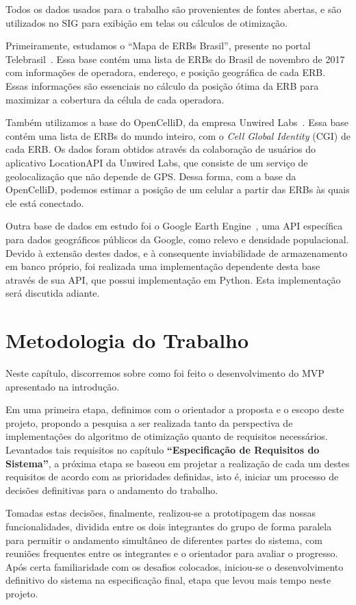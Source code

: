 \documentclass[]{politex}
\begin{document}
Todos os dados usados para o trabalho são provenientes de fontes abertas, e são
utilizados no SIG para exibição em telas ou cálculos de otimização.

Primeiramente, estudamos o ``Mapa de ERBs Brasil'', presente no portal
Telebrasil~\cite{mapa-erb}. Essa base contém uma lista de ERBs do Brasil de
novembro de 2017 com informações de operadora, endereço, e posição geográfica de
cada ERB. Essas informações são essenciais no cálculo da posição ótima da ERB
para maximizar a cobertura da célula de cada operadora.

Também utilizamos a base do OpenCelliD, da empresa Unwired
Labs~\cite{opencellid}. Essa base contém uma lista de ERBs do mundo inteiro, com
o \textit{Cell Global Identity} (CGI) de cada ERB. Os dados foram
obtidos através da colaboração de usuários do aplicativo LocationAPI da Unwired
Labs, que consiste de um serviço de geolocalização que não depende de GPS. Dessa
forma, com a base da OpenCelliD, podemos estimar a posição de um celular a
partir das ERBs às quais ele está conectado.

Outra base de dados em estudo foi o Google Earth Engine~\cite{earthengine}, uma
API específica para dados geográficos públicos da Google, como relevo e
densidade populacional. Devido à extensão destes dados, e à consequente
inviabilidade de armazenamento em banco próprio, foi realizada uma implementação
dependente desta base através de sua API, que possui implementação em Python.
Esta implementação será discutida adiante.

\chapter{Metodologia do Trabalho}

Neste capítulo, discorremos sobre como foi feito o desenvolvimento do MVP
apresentado na introdução.

Em uma primeira etapa, definimos com o orientador a proposta e o escopo deste
projeto, propondo a pesquisa a ser realizada tanto da perspectiva de
implementações do algoritmo de otimização quanto de requisitos necessários.
Levantados tais requisitos no capítulo \textbf{``Especificação de Requisitos do
Sistema''}, a próxima etapa se baseou em projetar a realização de cada um destes
requisitos de acordo com as prioridades definidas, isto é, iniciar um processo
de decisões definitivas para o andamento do trabalho.

Tomadas estas decisões, finalmente, realizou-se a prototipagem das nossas
funcionalidades, dividida entre os dois integrantes do grupo de forma paralela
para permitir o andamento simultâneo de diferentes partes do sistema, com
reuniões frequentes entre os integrantes e o orientador para avaliar o
progresso. Após certa familiaridade com os desafios colocados, iniciou-se o
desenvolvimento definitivo do sistema na especificação final, etapa que levou
mais tempo neste projeto.
\end{document}
